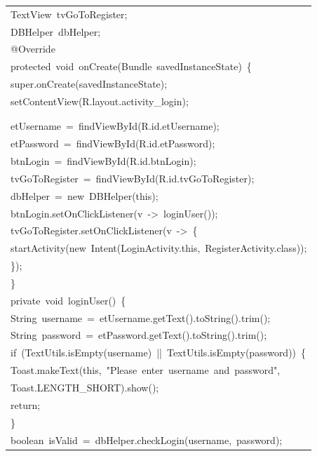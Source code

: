\documentclass[a4paper,12pt]{article}
\begin{document}
\begin{longtable}{|p{}|}
{\ttfamily\small TextView\ tvGoToRegister;} \\
{\ttfamily\small DBHelper\ dbHelper;} \\
{\ttfamily\small @Override} \\
{\ttfamily\small protected\ void\ onCreate(Bundle\ savedInstanceState)\ \{} \\
{\ttfamily\small super.onCreate(savedInstanceState);} \\
{\ttfamily\small setContentView(R.layout.activity\_login);} \\
\strut \\
\strut \\
{\ttfamily\small etUsername\ =\ findViewById(R.id.etUsername);} \\
{\ttfamily\small etPassword\ =\ findViewById(R.id.etPassword);} \\
{\ttfamily\small btnLogin\ =\ findViewById(R.id.btnLogin);} \\
{\ttfamily\small tvGoToRegister\ =\ findViewById(R.id.tvGoToRegister);} \\
{\ttfamily\small dbHelper\ =\ new\ DBHelper(this);} \\
{\ttfamily\small btnLogin.setOnClickListener(v\ -\textgreater{}\ loginUser());} \\
{\ttfamily\small tvGoToRegister.setOnClickListener(v\ -\textgreater{}\ \{} \\
{\ttfamily\small startActivity(new\ Intent(LoginActivity.this,\ RegisterActivity.class));} \\
{\ttfamily\small \});} \\
{\ttfamily\small \}} \\
{\ttfamily\small private\ void\ loginUser()\ \{} \\
{\ttfamily\small String\ username\ =\ etUsername.getText().toString().trim();} \\
{\ttfamily\small String\ password\ =\ etPassword.getText().toString().trim();} \\
{\ttfamily\small if\ (TextUtils.isEmpty(username)\ ||\ TextUtils.isEmpty(password))\ \{} \\
{\ttfamily\small Toast.makeText(this,\ "Please\ enter\ username\ and\ password",} \\
{\ttfamily\small Toast.LENGTH\_SHORT).show();} \\
{\ttfamily\small return;} \\
{\ttfamily\small \}} \\
{\ttfamily\small boolean\ isValid\ =\ dbHelper.checkLogin(username,\ password);} \\

\end{longtable}
\end{document}
